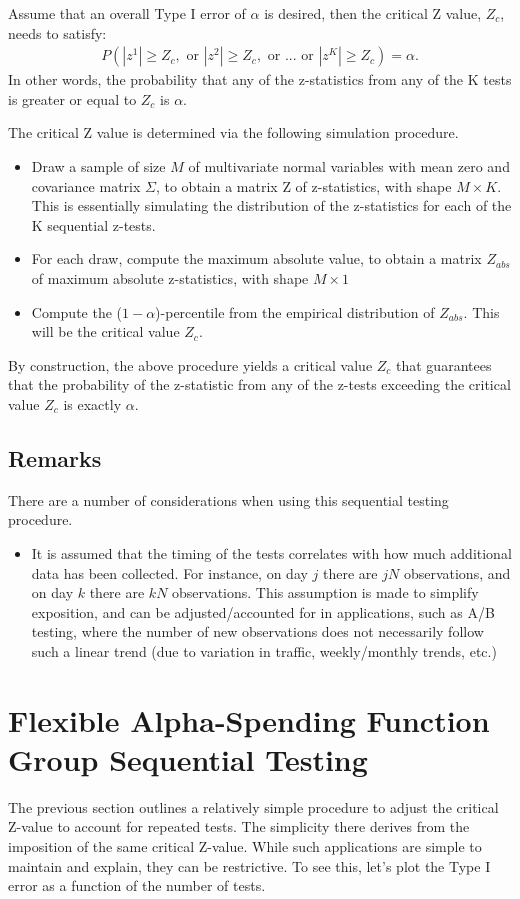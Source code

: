 \documentclass[final,3p,times]{elsarticle}
\begin{document}
Assume that an overall Type I error of $\alpha$ is desired, then the critical Z value, $Z_c$, needs to satisfy:
\begin{align*}
P(|z^1| \geq Z_c, \mbox{ or } |z^2| \geq Z_c, \mbox{ or } ... \mbox{ or }|z^K| \geq Z_c) = \alpha.
\end{align*}
In other words, the probability that any of the z-statistics from any of the K tests is greater or equal to $Z_c$ is $\alpha$.

The critical Z value is determined via the following simulation procedure.
\begin{itemize}
\item Draw a sample of size $M$ of multivariate normal variables with mean zero and covariance matrix $\Sigma$, to obtain a matrix Z of z-statistics, with shape $M\times K$. This is essentially simulating the distribution of the z-statistics for each of the K sequential z-tests.
\item For each draw, compute the maximum absolute value, to obtain a matrix $Z_{abs}$ of maximum absolute z-statistics, with shape  $M\times 1$
\item Compute the ($1-\alpha$)-percentile from the empirical distribution of $Z_{abs}$. This will be the critical value $Z_c$.
\end{itemize}

By construction, the above procedure yields a critical value $Z_c$ that guarantees that the probability of the z-statistic from any of the z-tests exceeding the critical value $Z_c$ is exactly $\alpha$.

\subsection{Remarks}
There are a number of considerations when using this sequential testing procedure.

\begin{itemize}
\item It is assumed that the timing of the tests correlates with how much additional data has been collected. For instance, on day $j$ there are $jN$ observations, and on day $k$ there are $kN$ observations. This assumption is made to simplify exposition, and can be adjusted/accounted for in applications, such as A/B testing, where the number of new observations does not necessarily follow such a linear trend (due to variation in traffic, weekly/monthly trends, etc.)
\end{itemize}

\section{Flexible Alpha-Spending Function Group Sequential Testing}
The previous section outlines a relatively simple procedure to adjust the critical Z-value to account for repeated tests. The simplicity there derives from the imposition of the same critical Z-value. While such applications are simple to maintain and explain, they can be restrictive. To see this, let's plot the Type I error as a function of the number of tests.
\end{document}
